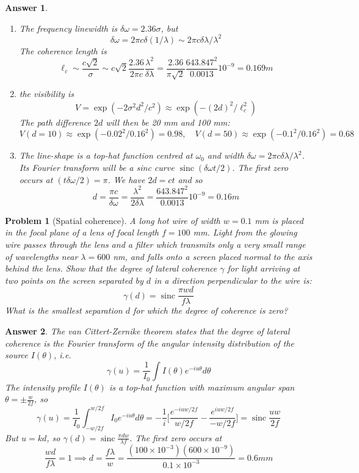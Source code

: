 \documentclass[a4paper]{article}
\DeclareMathOperator{\sinc}{sinc}
\newtheorem{ans}{Answer}[section]
\theoremstyle{new}
\newtheorem{qns}{Problem}[section]
\begin{document}
\begin{ans}\leavevmode
\begin{enumerate}[label=(\alph*)]
\item The frequency linewidth is $\delta\omega=2.36\sigma$, but
$$\delta\omega=2\pi c\delta(1/\lambda)\sim2\pi c\delta\lambda/\lambda^2$$
The coherence length is
$$\ell_c\sim\frac{c\sqrt{2}}{\sigma}\sim c\sqrt{2}\frac{2.36}{2\pi c}\frac{\lambda^2}{\delta\lambda}=\frac{2.36}{\pi\sqrt{2}}\frac{643.847^2}{0.0013}10^{-9}=0.169m$$
\item the visibility is
$$V=\exp(-2\sigma^2d^2/c^2)\approx\exp(-(2d)^2/\ell_c^2)$$
The path difference $2d$ will then be 20 mm and 100 mm:
$$V(d=10)\approx\exp(-0.02^2/0.16^2)=0.98,\quad V(d=50)\approx\exp(-0.1^2/0.16^2)=0.68$$
\item The line-shape is a top-hat function centred at $\omega_0$ and width $\delta\omega=2\pi c\delta\lambda/\lambda^2$. Its Fourier transform will be a sinc curve $\sinc(\delta\omega t/2)$. The first zero occurs at $(t\delta\omega/2)=\pi$. We have $2d=ct$ and so
$$d=\frac{\pi c}{\delta\omega}=\frac{\lambda^2}{2\delta\lambda}=\frac{643.847^2}{0.0013}10^{-9}=0.16 m$$
\end{enumerate}
\end{ans}
\begin{qns}[Spatial coherence]
A long hot wire of width $w = 0.1$ mm is placed in the focal plane of a lens of focal length $f = 100$ mm. Light from the glowing wire passes through the lens and a filter which transmits only a very small range of wavelengths near $\lambda=600$ nm, and falls onto a screen placed normal to the axis behind the lens. Show that the degree of lateral coherence $\gamma$ for light arriving at two points on the screen separated by $d$ in a direction perpendicular to the wire is:
$$\gamma(d)=\sinc\frac{\pi wd}{f\lambda}$$
What is the smallest separation $d$ for which the degree of coherence is zero?
\end{qns}
\begin{ans}
The van Cittert-Zernike theorem states that the degree of lateral coherence is the Fourier transform of the angular intensity distribution of the source $I(\theta)$, i.e.
$$\gamma(u)=\frac{1}{I_0}\int I(\theta)e^{-iu\theta}d\theta$$
The intensity profile $I(\theta)$ is a top-hat function with maximum angular span $\theta=\pm\frac{w}{2f}$, so
$$\gamma(u)=\frac{1}{I_0}\int_{-w/2f}^{w/2f}I_0e^{-iu\theta}d\theta=-\frac{1}{i}\bigg[\frac{e^{-iuw/2f}}{w/2f}-\frac{e^{iuw/2f}}{-w/2f}\bigg]=\sinc\frac{uw}{2f}$$
But $u=kd$, so $\gamma(d)=\sinc\frac{\pi dw}{\lambda f}$. The first zero occurs at 
$$\frac{wd}{f\lambda}=1\implies d=\frac{f\lambda}{w}=\frac{(100\times10^{-3})(600\times10^{-9})}{0.1\times10^{-3}}=0.6mm$$
\end{ans}
\newpage
\end{document}
